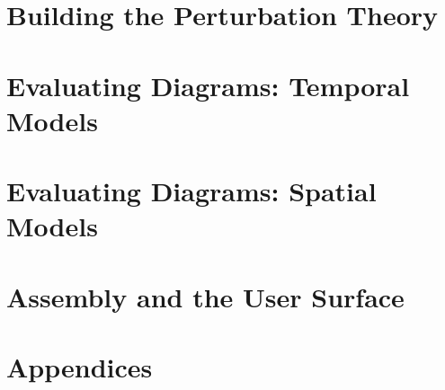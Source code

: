 \documentclass[11pt,oneside]{report}
\theoremstyle{definition}
\begin{document}
\part{Building the Perturbation Theory}







\part{Evaluating Diagrams: Temporal Models}



\part{Evaluating Diagrams: Spatial Models}




\part{Assembly and the User Surface}






\appendix
\part{Appendices}




\end{document}
